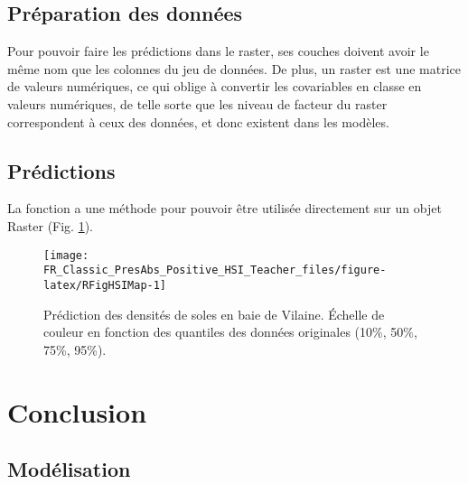 \documentclass[french,a4paper]{article}
\begin{document}
\hypertarget{preparation-des-donnees}{%
\subsection{Préparation des données}\label{preparation-des-donnees}}

Pour pouvoir faire les prédictions dans le raster, ses couches doivent avoir le même nom que les colonnes du jeu de données. De plus, un raster est une matrice de valeurs numériques, ce qui oblige à convertir les covariables en classe en valeurs numériques, de telle sorte que les niveau de facteur du raster correspondent à ceux des données, et donc existent dans les modèles. 

\hypertarget{predictions-1}{%
\subsection{Prédictions}\label{predictions-1}}

La fonction  a une méthode pour pouvoir être utilisée directement sur un objet Raster (Fig. \ref{fig:RFigHSIMap}).



\begin{figure}[!h]

{\centering \texttt{[image: FR\_Classic\_PresAbs\_Positive\_HSI\_Teacher\_files/figure-latex/RFigHSIMap-1]} 

}

\caption{Prédiction des densités de soles en baie de Vilaine. Échelle de couleur en fonction des quantiles des données originales (10\%, 50\%, 75\%, 95\%).}\label{fig:RFigHSIMap}
\end{figure}

\hypertarget{conclusion-1}{%
\section{Conclusion}\label{conclusion-1}}

\hypertarget{modelisation}{%
\subsection{Modélisation}\label{modelisation}}
\end{document}
